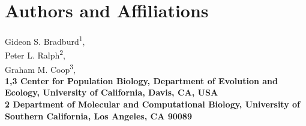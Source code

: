 
\section*{Authors and Affiliations}
\begin{flushleft}
Gideon S. Bradburd\textsuperscript{1},\\
Peter L. Ralph\textsuperscript{2},\\
Graham M. Coop\textsuperscript{3},\\
\bf{1,3} Center for Population Biology, Department of Evolution and Ecology, University of California, Davis, CA, USA
\\
\bf{2} Department of Molecular and Computational Biology, University of Southern California, Los Angeles, CA 90089\\
\end{flushleft}


\newcommand{\Exp}{\mathop{\mbox{Exp}}}
\newcommand{\cov}{\mathop{\mbox{Cov}}}
\newcommand{\var}{\mathop{\mbox{Var}}}




%

\newpage

